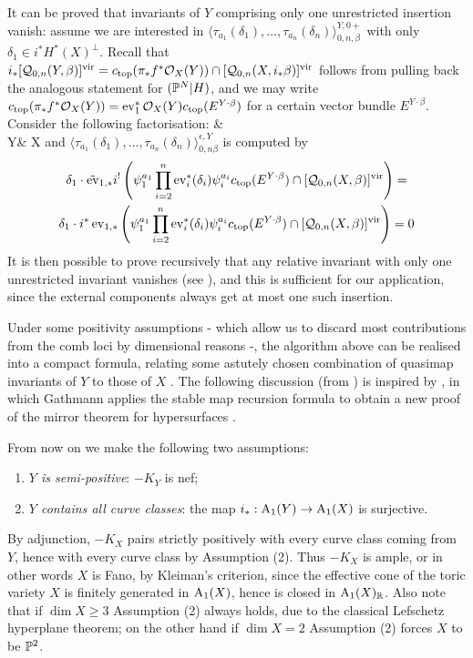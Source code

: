 It can be proved that invariants of $Y$ comprising only one unrestricted insertion vanish: assume we are interested in $\langle\tau_{a_1}(\delta_1),\ldots,\tau_{a_n}(\delta_n)\rangle^{Y,0+}_{0,n,\beta}$ with only $\delta_1\in i^*H^*(X)^\perp$. Recall that $i_*[\mathcal{Q}_{0,n}(Y,\beta)]^{\mathrm{vir}}=c_{\text{top}}(\pi_*f^*\mathcal{O}_X(Y))\cap [\mathcal{Q}_{0,n}(X,i_*\beta)]^{\mathrm{vir}}$ follows from pulling back the analogous statement for $(\mathbb P^N|H)$, and we may write $c_{\text{top}}(\pi_*f^*\mathcal{O}_X(Y))=\operatorname{ev}_1^*\mathcal{O}_X(Y)c_{\text{top}}(E^{Y\cdot\beta})$ for a certain vector bundle $E^{Y\cdot\beta}$. Consider the following factorisation:
\bcd
{}\ar[r,"j"]\ar[d,"\tilde\ev_1"] & \ar[d,"\ev_1"] \\
Y\ar[r,"i"] & X
\ecd
and $\langle\tau_{a_1}(\delta_1),\ldots,\tau_{a_n}(\delta_n)\rangle^{\epsilon,Y}_{0,n\beta}$ is computed by
\begin{multline*}
 \delta_1\cdot\tilde{\operatorname{ev}}_{1,*}i^!\left(\psi_1^{a_1}\prod_{i=2}^n\operatorname{ev}_i^*(\delta_i)\psi_i^{a_i}c_{\text{top}}(E^{Y\cdot\beta})\cap[\mathcal{Q}_{0,n}(X,\beta)]^{\mathrm{vir}}\right)= \\
 \delta_1\cdot i^*\operatorname{ev}_{1,*}\left(\psi_1^{a_1}\prod_{i=2}^n\operatorname{ev}_i^*(\delta_i)\psi_i^{a_i}c_{\text{top}}(E^{Y\cdot\beta})\cap[\mathcal{Q}_{0,n}(X,\beta)]^{\mathrm{vir}}\right) =0
\end{multline*}
It is then possible to prove recursively that any relative invariant with only one unrestricted invariant vanishes (see \cite[Lemma 5.6]{Ga}), and this is sufficient for our application, since the external components always get at most one such insertion.

\smallskip

Under some positivity assumptions - which allow us to discard most contributions from the comb loci by dimensional reasons -, the algorithm above can be realised into a compact formula, relating some astutely chosen combination of quasimap invariants of $Y$ to those of $X$ . The following discussion (from \cite[\S 5]{BN}) is inspired by \cite{Ga-MF}, in which Gathmann applies the stable map recursion formula to obtain a new proof of the mirror theorem for hypersurfaces \cite{Givental-equivariantGW}.

From now on we make the following two assumptions:
\begin{enumerate}
\item \emph{$Y$ is semi-positive}: $-K_Y$ is nef;
\item \emph{$Y$ contains all curve classes}: the map $i_* : \operatorname{A}_1(Y) \rightarrow \operatorname{A}_1(X)$ is surjective.
\end{enumerate}
\begin{rmk}
 By adjunction, $-K_X$ pairs strictly positively with every curve class coming from $Y$, hence with every curve class by Assumption (2). Thus $-K_X$ is ample, or in other words $X$ is Fano, by Kleiman's criterion, since the effective cone of the toric variety $X$ is finitely generated in $\operatorname{A}_1(X)$, hence is closed in $\operatorname{A}_1(X)_{\mathbb{R}}$. Also note that if $\dim X \geq 3$ Assumption (2) always holds, due to the classical Lefschetz hyperplane theorem; on the other hand if $\dim X = 2$ Assumption (2) forces $X$ to be $\mathbb P^2$.
\end{rmk}

